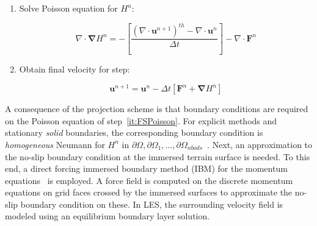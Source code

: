 \documentclass[journal,article,atmosphere,submit,moreauthors,pdftex]{Definitions/mdpi}
\begin{document}
\begin{enumerate}
  \item Solve Poisson equation for $H^n$:

\begin{equation}
   \nabla \cdot \boldsymbol{\nabla} H^n = - \left[ \frac{\left( \nabla \cdot \mathbf{u}^{n+1} \right)^{th} - \nabla \cdot \mathbf{u}^{n}}{\Delta t} \right] - \nabla \cdot \mathbf{F}^n \label{it:FSPoisson}
\end{equation}

  \item Obtain final velocity for step:

  \begin{equation}
     \mathbf{u}^{n+1} = \mathbf{u}^{n} - \Delta t \left[ \mathbf{F}^n +  \boldsymbol{\nabla} H^n \right] \label{it:FSProject}
   \end{equation}

\end{enumerate}
%
A consequence of the projection scheme is that boundary conditions are required on the Poisson equation of step~\eqref{it:FSPoisson}. For explicit methods and stationary \textit{solid} boundaries, the corresponding boundary condition is \textit{homogeneous} Neumann for $H^n$ in $\partial \Omega,\partial \Omega_1,...,\partial \Omega_{nbods}$~\cite{perot_1993}.
Next, an approximation to the no-slip boundary condition at the immersed terrain surface is needed. To this end, a direct forcing immersed boundary method (IBM) for the momentum equations~\cite{fadlun_2000} is employed. A force field is computed on the discrete momentum equations on grid faces crossed by the immersed surfaces to approximate the no-slip boundary condition on these. In LES, the surrounding velocity field is modeled using an equilibrium boundary layer solution.
\end{document}
